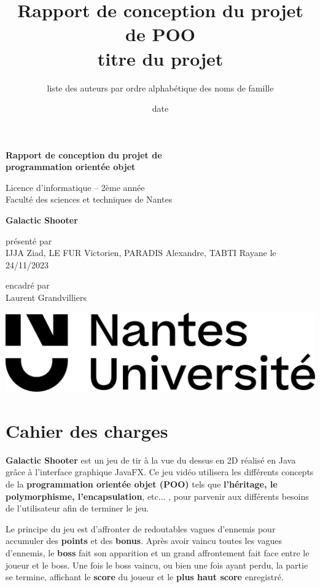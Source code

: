 \documentclass[12pt]{article}
\title{{\bf Rapport de conception du projet de POO}\\[3mm]
{\large titre du projet}}
\author{liste des auteurs par ordre alphabétique des noms de famille}
\date{date}
\begin{document}
\thispagestyle{empty}

{\Large\bf Rapport de conception du projet de\\[1mm]
programmation orientée objet}

\vspace*{20mm}

{\large Licence d'informatique -- 2ème année\\[1mm]
Faculté des sciences et techniques de Nantes}

\vspace*{20mm}

{\large\textbf {Galactic Shooter}}

\vspace*{20mm}

{\large présenté par\\[1mm]
IJJA Ziad, LE FUR Victorien, PARADIS Alexandre, TABTI Rayane
\newline le 24/11/2023

\vspace*{20mm}

{\large encadré par\\[1mm]
{Laurent Grandvilliers}}


\vfill
\includegraphics[width=.3\textwidth]{images/logo_nu.png}

\newpage

\section{Cahier des charges}

\textbf{Galactic Shooter} est un jeu de tir à la vue du dessus en 2D réalisé en Java grâce à l'interface graphique JavaFX. Ce jeu vidéo utilisera les différents concepts de la \textbf{programmation orientée objet (POO)} tels que \textbf{l'héritage, le polymorphisme, l'encapsulation}, etc... , pour parvenir aux différents besoins de l'utilisateur afin de terminer le jeu.

Le principe du jeu est d'affronter de redoutables vagues d'ennemis pour accumuler des \textbf{points} et des \textbf{bonus}. Après avoir vaincu toutes les vagues d'ennemis, le \textbf{boss} fait son apparition et un grand affrontement fait face entre le joueur et le boss. Une fois le boss vaincu, ou bien une fois ayant perdu, la partie se termine, affichant le \textbf{score} du joueur et le \textbf{plus haut score} enregistré.

}
\end{document}
